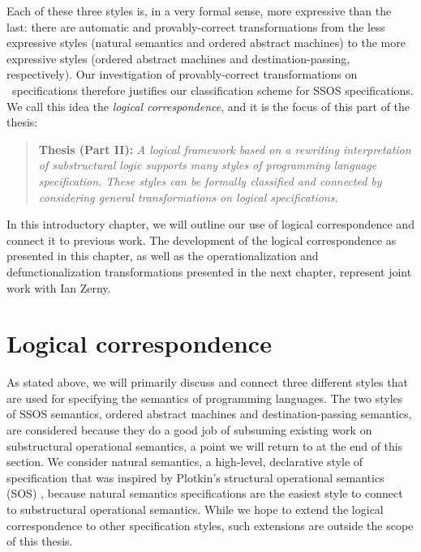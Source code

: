 \noindent
Each of these three styles is, in a very formal sense, more
expressive than the last: there are automatic and
provably-correct transformations from the less expressive styles
(natural semantics and ordered abstract machines) to the more
expressive styles (ordered abstract machines and destination-passing,
respectively).  Our investigation of provably-correct transformations
on \sls~specifications therefore justifies our classification scheme
for SSOS specifications. We call this idea the {\it logical
  correspondence}, and it is the focus of this part of the thesis:

\smallskip
\begin{quote} 
  {\bf Thesis (Part II):} {\it A logical framework based on a rewriting
  interpretation of substructural logic supports many styles of
  programming language specification. These styles can be formally
  classified and connected by considering general transformations on
  logical specifications.}
\end{quote} 
\smallskip



In this introductory chapter, we will outline our use of logical
correspondence and connect it to previous work. The development of the
logical correspondence as presented in this chapter, as well as the
operationalization and defunctionalization transformations presented
in the next chapter, represent joint work with Ian Zerny.



\section{Logical correspondence}
\label{section-introtologicalcorrespondence}

As stated above, we will primarily discuss and connect three different
styles that are used for specifying the semantics of programming
languages. The two styles of SSOS semantics, ordered abstract machines
and destination-passing semantics, are considered because they do a
good job of subsuming existing work on substructural operational
semantics, a point we will return to at the end of this
section. We consider natural semantics, a high-level, declarative style of
specification that was inspired by Plotkin's structural operational
semantics (SOS) \cite{plotkin04structural,kahn87natural},
because natural semantics specifications are the easiest style to connect
to substructural operational semantics. While we hope to extend the
logical correspondence to other specification styles, such extensions
are outside the scope of this thesis.

